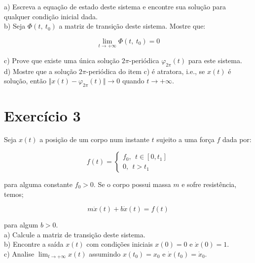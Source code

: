 \documentclass[11pt]{article}
\begin{document}
a) Escreva a equação de estado deste sistema e encontre sua solução para qualquer condição inicial dada.\\

b) Seja $\Phi(t,\ t_0)$ a matriz de transição deste sistema. Mostre que:

$$\lim_{t\to +\infty} \Phi(t,\ t_0) = 0$$

c) Prove que existe uma única solução $2\pi$-periódica $\varphi_{2\pi}(t)$ para este sistema.\\

d) Mostre que a solução $2\pi$-periódica do item c) é atratora, i.e., se $x(t)$ é solução,
então $\Vert x(t) - \varphi_{2\pi}(t)\Vert \to 0$ quando $t\to +\infty$.

\section*{Exercício 3}

Seja $x(t)$ a posição de um corpo num instante $t$ sujeito a uma força $f$ dada por:

$$f(t) = \begin{cases} f_0,\ \ t\in[0,t_1]\\
0,\ \ t > t_1 \end{cases}$$

para alguma constante $f_0 > 0$. Se o corpo possui massa $m$ e sofre resistência, temos;

$$m\ddot{x}(t) + b\dot{x}(t) = f(t)$$

para algum $b>0$.\\

a) Calcule a matriz de transição deste sistema.\\

b) Encontre a saída $x(t)$ com condições iniciais $x(0) = 0$ e $\dot{x}(0) = 1$.\\

c) Analise $\lim_{t\to +\infty} x(t)$ assumindo $x(t_0) = x_0$ e  $\dot{x}(t_0) = \dot{x}_0$.
\end{document}
